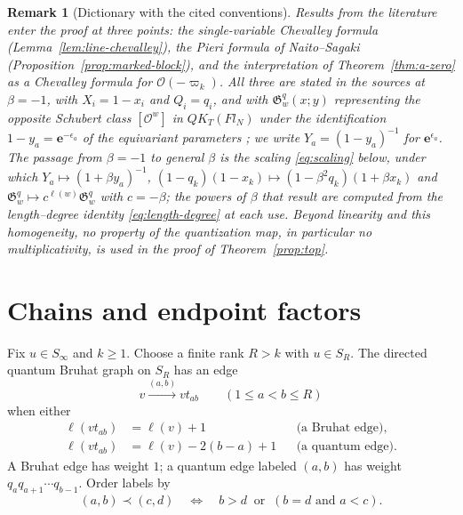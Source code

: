 \documentclass[11pt]{article}
\newtheorem{remark}[proposition]{Remark}
\newcommand{\G}{\mathfrak{G}}
\newcommand{\ellength}{\ell}
\begin{document}
\begin{remark}[Dictionary with the cited conventions]\label{rem:dictionary}
Results from the literature enter the proof at three points: the
single-variable Chevalley formula (Lemma~\ref{lem:line-chevalley}),
the Pieri formula of Naito--Sagaki
(Proposition~\ref{prop:marked-block}), and the interpretation of
Theorem~\ref{thm:a-zero} as a Chevalley formula for
$\mathcal O(-\varpi_k)$. All three are stated in the sources at
$\beta=-1$, with $X_i=1-x_i$ and $Q_i=q_i$, and with $\G^q_w(x;y)$
representing the opposite Schubert class $[\mathcal O^w]$ in
$QK_T(Fl_N)$ under the identification
$1-y_a=\mathbf e^{-\epsilon_a}$ of the equivariant parameters
\cite[Section~3.1]{maeno2024presentation2}; we write
$Y_a=(1-y_a)^{-1}$ for $\mathbf e^{\epsilon_a}$. The passage from
$\beta=-1$ to general $\beta$ is the scaling \eqref{eq:scaling}
below, under which $Y_a\mapsto(1+\beta y_a)^{-1}$,
$(1-q_k)(1-x_k)\mapsto(1-\beta^2q_k)(1+\beta x_k)$ and
$\G^q_w\mapsto c^{\ellength(w)}\G^q_w$ with $c=-\beta$; the powers of
$\beta$ that result are computed from the length--degree identity
\eqref{eq:length-degree} at each use. Beyond linearity and this
homogeneity, no property of the quantization map, in particular no
multiplicativity, is used in the proof of Theorem~\ref{prop:top}.
\end{remark}

\section{Chains and endpoint factors}

Fix $u\in S_\infty$ and $k\geq 1$. Choose a finite rank $R>k$ with
$u\in S_R$. The directed quantum Bruhat graph on $S_R$ has an edge
\[
 v\xrightarrow{(a,b)}vt_{ab}\qquad(1\leq a<b\leq R)
\]
when either
\begin{align*}
 \ellength(vt_{ab})&=\ellength(v)+1
       &&\text{(a Bruhat edge)},\\
 \ellength(vt_{ab})&=\ellength(v)-2(b-a)+1
       &&\text{(a quantum edge)}.
\end{align*}
A Bruhat edge has weight $1$; a quantum edge labeled $(a,b)$ has
weight $q_aq_{a+1}\cdots q_{b-1}$.
Order labels by
\[
 (a,b)\prec(c,d)
 \quad\Longleftrightarrow\quad
 b>d\ \text{ or }\ (b=d\text{ and }a<c).
\]
\end{document}
